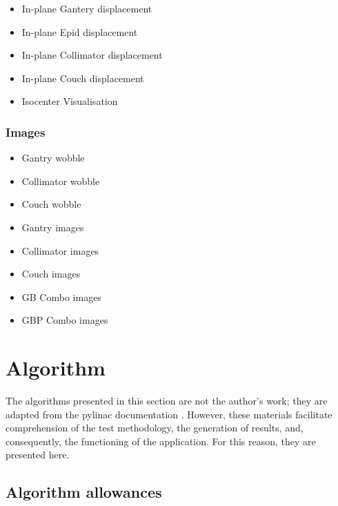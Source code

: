 \begin{multicols}{2}
\begin{itemize}

    \item In-plane Gantery displacement
    \item In-plane Epid displacement
    \item In-plane Collimator displacement
    \item In-plane Couch displacement
    \item Isocenter Visualisation
    
\end{itemize}
\end{multicols}

\subsubsection{Images}

\begin{multicols}{2}
\begin{itemize}

    \item Gantry wobble
    \item Collimator wobble
    \item Couch wobble
    \item Gantry images
    \item Collimator images
    \item Couch images
    \item GB Combo images
    \item GBP Combo images
    
\end{itemize}
\end{multicols}

\section{Algorithm} 

The algorithms presented in this section are not the author's work; they are adapted from the pylinac documentation \cite{pylinac_wl_algorithm}. However, these materials facilitate comprehension of the test methodology, the generation of results, and, consequently, the functioning of the application. For this reason, they are presented here.

\subsection{Algorithm allowances}

